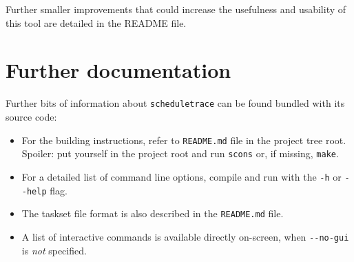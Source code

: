 \documentclass[paper=a4, fontsize=11pt]{scrartcl}
\newcommand{\mono}[1]{\texttt{#1}}
\numberwithin{equation}{section}        %
\numberwithin{figure}{section}          %
\numberwithin{table}{section}               %
\numberwithin{fragment}{section}
\begin{document}
Further smaller improvements that could increase the usefulness and usability of this tool are detailed in the README file.


\section*{Further documentation}
\label{sec:docs}

Further bits of information about \mono{scheduletrace} can be found bundled with its source code:

\begin{itemize}
\item For the building instructions, refer to \mono{README.md} file in the project tree root. Spoiler: put yourself in the project root and run \mono{scons} or, if missing, \mono{make}.
\item For a detailed list of command line options, compile and run with the \mono{-h} or \mono{-{}-help} flag.
\item The taskset file format is also described in the \mono{README.md} file.
\item A list of interactive commands is available directly on-screen, when \mono{-{}-no-gui} is \textit{not} specified.
\end{itemize}

\end{document}
